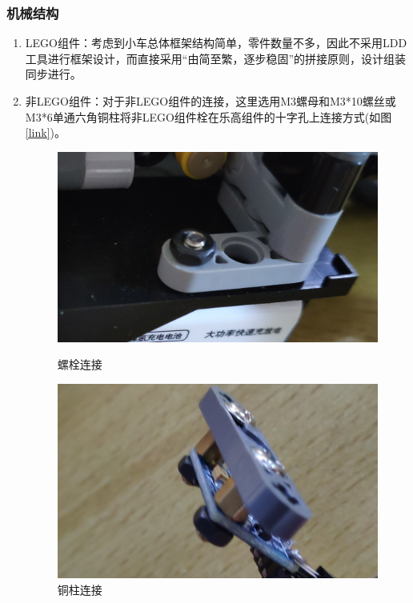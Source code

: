 \documentclass[a4paper]{ctexart}
\begin{document}
\begin{spacing}{1.5}
\subsubsection{机械结构}
\begin{enumerate}
	\item LEGO组件：考虑到小车总体框架结构简单，零件数量不多，因此不采用LDD工具进行框架设计，而直接采用“由简至繁，逐步稳固”的拼接原则，设计组装同步进行。
	\item 非LEGO组件：对于非LEGO组件的连接，这里选用M3螺母和M3*10螺丝或M3*6单通六角铜柱将非LEGO组件栓在乐高组件的十字孔上连接方式(如图\ref{link})。
	\begin{figure}[htbp]
		\begin{minipage}[t]{0.505\textwidth}
			\centering
			\includegraphics[width=\textwidth]{figure//L1.jpg}
			\caption*{螺栓连接}
		\end{minipage}%
		\hfill
		\begin{minipage}[t]{0.495\textwidth}
			\centering
			\includegraphics[width=\textwidth]{figure//L2.jpg}
			\caption*{铜柱连接}

\end{minipage}
\end{figure}
\end{enumerate}
\end{spacing}
\end{document}
